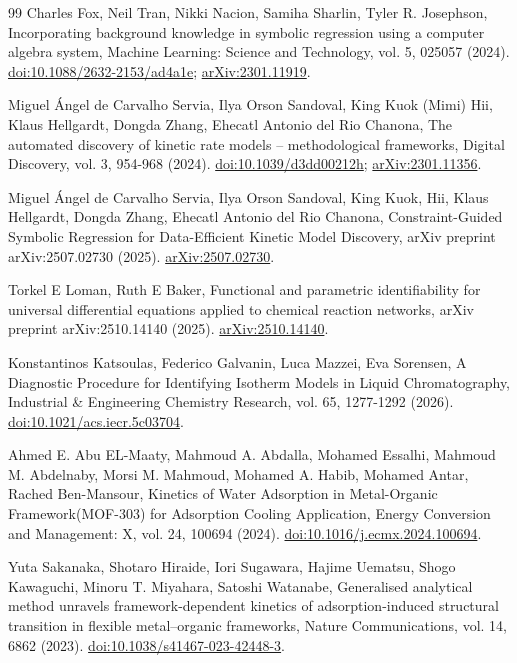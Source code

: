 \documentclass[11pt]{article}
\begin{document}
\begin{thebibliography}{99}
 Charles Fox, Neil Tran, Nikki Nacion, Samiha Sharlin, Tyler R. Josephson, Incorporating background knowledge in symbolic regression using a computer algebra system, Machine Learning: Science and Technology, vol. 5, 025057 (2024). \href{https://doi.org/10.1088/2632-2153/ad4a1e}{doi:10.1088/2632-2153/ad4a1e}; \href{https://arxiv.org/abs/2301.11919}{arXiv:2301.11919}.

 Miguel Ángel de Carvalho Servia, Ilya Orson Sandoval, King Kuok (Mimi) Hii, Klaus Hellgardt, Dongda Zhang, Ehecatl Antonio del Rio Chanona, The automated discovery of kinetic rate models -- methodological frameworks, Digital Discovery, vol. 3, 954-968 (2024). \href{https://doi.org/10.1039/d3dd00212h}{doi:10.1039/d3dd00212h}; \href{https://arxiv.org/abs/2301.11356}{arXiv:2301.11356}.

 Miguel Ángel de Carvalho Servia, Ilya Orson Sandoval, King Kuok, Hii, Klaus Hellgardt, Dongda Zhang, Ehecatl Antonio del Rio Chanona, Constraint-Guided Symbolic Regression for Data-Efficient Kinetic Model Discovery, arXiv preprint arXiv:2507.02730 (2025). \href{https://arxiv.org/abs/2507.02730}{arXiv:2507.02730}.

 Torkel E Loman, Ruth E Baker, Functional and parametric identifiability for universal differential equations applied to chemical reaction networks, arXiv preprint arXiv:2510.14140 (2025). \href{https://arxiv.org/abs/2510.14140}{arXiv:2510.14140}.

 Konstantinos Katsoulas, Federico Galvanin, Luca Mazzei, Eva Sorensen, A Diagnostic Procedure for Identifying Isotherm Models in Liquid Chromatography, Industrial \& Engineering Chemistry Research, vol. 65, 1277-1292 (2026). \href{https://doi.org/10.1021/acs.iecr.5c03704}{doi:10.1021/acs.iecr.5c03704}.

 Ahmed E. Abu EL-Maaty, Mahmoud A. Abdalla, Mohamed Essalhi, Mahmoud M. Abdelnaby, Morsi M. Mahmoud, Mohamed A. Habib, Mohamed Antar, Rached Ben-Mansour, Kinetics of Water Adsorption in Metal-Organic Framework(MOF-303) for Adsorption Cooling Application, Energy Conversion and Management: X, vol. 24, 100694 (2024). \href{https://doi.org/10.1016/j.ecmx.2024.100694}{doi:10.1016/j.ecmx.2024.100694}.

 Yuta Sakanaka, Shotaro Hiraide, Iori Sugawara, Hajime Uematsu, Shogo Kawaguchi, Minoru T. Miyahara, Satoshi Watanabe, Generalised analytical method unravels framework-dependent kinetics of adsorption-induced structural transition in flexible metal--organic frameworks, Nature Communications, vol. 14, 6862 (2023). \href{https://doi.org/10.1038/s41467-023-42448-3}{doi:10.1038/s41467-023-42448-3}.


\end{thebibliography}
\end{document}
